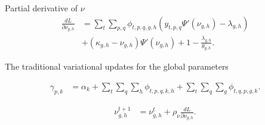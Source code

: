 %
%
%


Partial derivative of $\nu$
\begin{align}
\frac{dL}{\partial\nu_{g,h}} &= \sum_{t} \! \sum_{p,q} \! 
\phi_{t,p,q,g,h} (y_{t,p,q} \Psi'(\nu_{g,h}) - \lambda_{g,h})
\nonumber\\  & + (\kappa_{g,h} - \nu_{g,h})\Psi'(\nu_{g,h}) + 
1 - \frac{\lambda_{g,h}}{\theta_{g,h}}.
\label{eqn:partialNu}
\end{align}

The traditional variational updates for the global parameters

\begin{align}
\gamma_{p,k} &= \alpha_{k} + \sum_{t} \! \sum_{q} \! \sum_{h} \! \phi_{t,p,q,k,h} 
+ \sum_{t} \! \sum_{q} \! \sum_{g} \! \phi_{t,q,p,g,k}.
\label{eqn:gammaUp}
\end{align}

\begin{align}
\nu_{g,h}^{t+1} &= \nu_{g,h}^{t}+\rho_\nu \frac{dL}{\partial\nu_{g,h}}. 
\label{eqn:nuUp}
\end{align}

